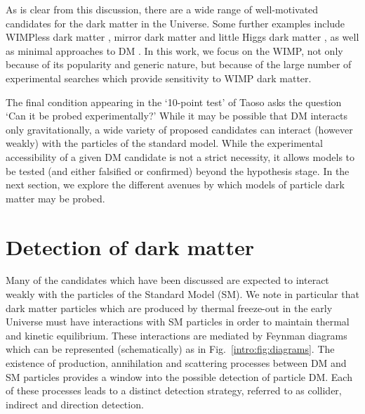 As is clear from this discussion, there are a wide range of well-motivated candidates for the dark matter in the Universe. Some further examples include WIMPless dark matter \cite{Feng:2010}, mirror dark matter \cite{Foot:2014} and little Higgs dark matter \cite{Birkedal:2006}, as well as minimal approaches to DM \cite{Cirelli:2007}. In this work, we focus on the WIMP, not only because of its popularity and generic nature, but because of the large number of experimental searches which provide sensitivity to WIMP dark matter.


The final condition appearing in the `10-point test' of Taoso \etal asks the question `Can it be probed experimentally?' While it may be possible that DM interacts only gravitationally, a wide variety of proposed candidates can interact (however weakly) with the particles of the standard model. While the experimental accessibility of a given DM candidate is not a strict necessity, it allows models to be tested (and either falsified or confirmed) beyond the hypothesis stage. In the next section, we explore the different avenues by which models of particle dark matter may be probed.

\section{Detection of dark matter}
\label{sec:intro:detection}
Many of the candidates which have been discussed are expected to interact weakly with the particles of the Standard Model (SM). We note in particular that dark matter particles which are produced by thermal freeze-out in the early Universe must have interactions with SM particles in order to maintain thermal and kinetic equilibrium. These interactions are mediated by Feynman diagrams which can be represented (schematically) as in Fig.~\ref{intro:fig:diagrams}. The existence of production, annihilation and scattering processes between DM and SM particles provides a window into the possible detection of particle DM. Each of these processes leads to a distinct detection strategy, referred to as collider, indirect and direction detection.

